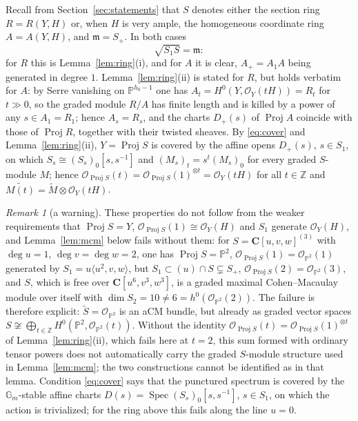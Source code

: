 \documentclass[11pt]{amsart}
\theoremstyle{remark}
\newtheorem{remark}[theorem]{Remark}
\theoremstyle{definition}
\newcommand{\PP}{\mathbb{P}}
\newcommand{\ZZ}{\mathbb{Z}}
\newcommand{\CC}{\mathbf{C}}
\newcommand{\cO}{\mathcal{O}}
\DeclareMathOperator{\Proj}{Proj}
\DeclareMathOperator{\Spec}{Spec}
\begin{document}
Recall from Section~\ref{sec:statements} that $S$ denotes either the section ring $R=R(Y,H)$ or, when $H$ is very ample, the homogeneous coordinate ring $A=A(Y,H)$, and $\mathfrak m=S_+$. In both cases
\begin{equation}\label{eq:cover}
\sqrt{S_1S}=\mathfrak m :
\end{equation}
for $R$ this is Lemma~\ref{lem:ring}(i), and for $A$ it is clear, $A_+=A_1A$ being generated in degree $1$. Lemma~\ref{lem:ring}(ii) is stated for $R$, but holds verbatim for $A$: by Serre vanishing on $\PP^{h_0-1}$ one has $A_t=H^0(Y,\cO_Y(tH))=R_t$ for $t\gg0$, so the graded module $R/A$ has finite length and is killed by a power of any $s\in A_1=R_1$; hence $A_s=R_s$, and the charts $D_+(s)$ of $\Proj A$ coincide with those of $\Proj R$, together with their twisted sheaves. By \eqref{eq:cover} and Lemma~\ref{lem:ring}(ii), $Y=\Proj S$ is covered by the affine opens $D_+(s)$, $s\in S_1$, on which $S_s\cong(S_s)_0[s,s^{-1}]$ and $(M_s)_t=s^t(M_s)_0$ for every graded $S$-module $M$; hence $\cO_{\Proj S}(t)=\cO_{\Proj S}(1)^{\otimes t}=\cO_Y(tH)$ for all $t\in\ZZ$ and $\widetilde{M(t)}=\widetilde M\otimes\cO_Y(tH)$.

\begin{remark}[a warning]\label{rem:warning}
These properties do not follow from the weaker requirements that $\Proj S=Y$, $\cO_{\Proj S}(1)\cong\cO_Y(H)$ and $S_1$ generate $\cO_Y(H)$, and Lemma~\ref{lem:mcm} below fails without them: for $S=\CC[u,v,w]^{(3)}$ with $\deg u=1$, $\deg v=\deg w=2$, one has $\Proj S=\PP^2$, $\cO_{\Proj S}(1)=\cO_{\PP^2}(1)$ generated by $S_1=u\langle u^2,v,w\rangle$, but $S_1\subset(u)\cap S\subsetneq S_+$, $\cO_{\Proj S}(2)=\cO_{\PP^2}(3)$, and $S$, which is free over $\CC[u^6,v^3,w^3]$, is a graded maximal Cohen--Macaulay module over itself with $\dim S_2=10\ne6=h^0(\cO_{\PP^2}(2))$. The failure is therefore explicit: $\widetilde S=\cO_{\PP^2}$ is an aCM bundle, but already as graded vector spaces $S\not\cong\bigoplus_{t\in\ZZ}H^0(\PP^2,\cO_{\PP^2}(t))$. Without the identity $\cO_{\Proj S}(t)=\cO_{\Proj S}(1)^{\otimes t}$ of Lemma~\ref{lem:ring}(ii), which fails here at $t=2$, this sum formed with ordinary tensor powers does not automatically carry the graded $S$-module structure used in Lemma~\ref{lem:mcm}; the two constructions cannot be identified as in that lemma. Condition \eqref{eq:cover} says that the punctured spectrum is covered by the $\mathbb G_m$-stable affine charts $D(s)=\Spec(S_s)_0[s,s^{-1}]$, $s\in S_1$, on which the action is trivialized; for the ring above this fails along the line $u=0$.
\end{remark}
\end{document}

